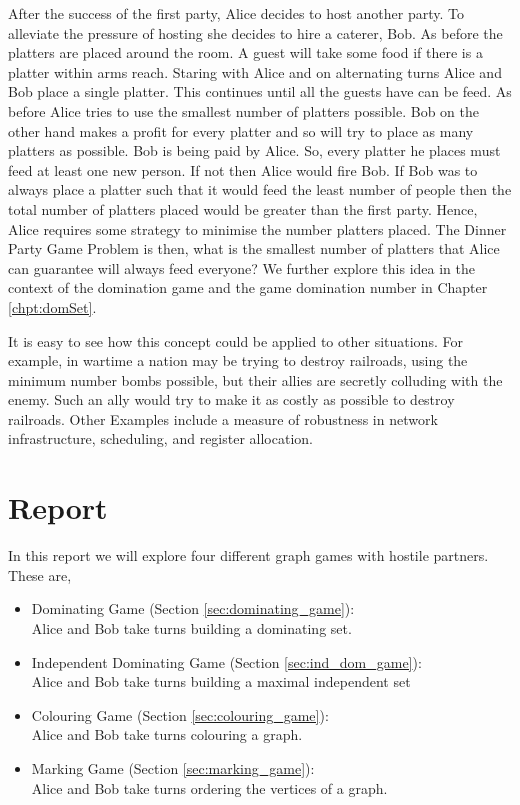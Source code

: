 After the success of the first party, Alice decides to host another party. To alleviate the pressure of hosting she decides to hire a caterer, Bob. As before the platters are placed around the room. A guest will take some food if there is a platter within arms reach. Staring with Alice and on alternating turns Alice and Bob place a single platter. This continues until all the guests have can be feed. As before Alice tries to use the smallest number of platters possible. Bob on the other hand makes a profit for every platter and so will try to place as many platters as possible. Bob is being paid by Alice. So, every platter he places must feed at least one new person. If not then Alice would fire Bob. If Bob was to always place a platter such that it would feed the least number of people then the total number of platters placed would be greater than the first party. Hence, Alice requires some strategy to minimise the number platters placed. The Dinner Party Game Problem is then, what is the smallest number of platters that Alice can guarantee will always feed everyone? 
We further explore this idea in the context of the domination game and the game domination number in Chapter \ref{chpt:domSet}.

It is easy to see how this concept could be applied to other situations. For example, in wartime a nation may be trying to destroy railroads, using the minimum number bombs possible, but their allies are secretly colluding with the enemy. Such an ally would try to make it as costly as possible to destroy railroads. Other Examples include a measure of robustness in network infrastructure, scheduling, and register allocation.  

\section{Report}

In this report %
we will explore four different graph games with hostile partners. These are,
\begin{itemize}
    \item Dominating Game (Section \ref{sec:dominating_game}): \\
        Alice and Bob take turns building a dominating set.
    \item Independent Dominating Game (Section \ref{sec:ind_dom_game}): \\
        Alice and Bob take turns building a maximal independent set    
    \item Colouring Game (Section \ref{sec:colouring_game}): \\
        Alice and Bob take turns colouring a graph.
    \item Marking Game (Section \ref{sec:marking_game}): \\
        Alice and Bob take turns ordering the vertices of a graph.
\end{itemize}

